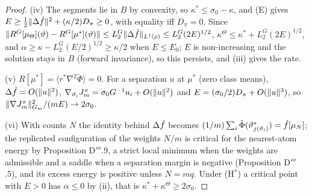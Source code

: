 \begin{proof}
(iv) The segments lie in $B$ by convexity, so $\kappa^*\le\sigma_0 - \kappa$, and (E) gives
$E\ge\frac12\lVert \Delta\hat f\rVert^2 + (\kappa/2)D_\pi\ge0$, with equality iff $D_\pi = 0$. Since
$\lVert R^G[\mu_\Theta](\vartheta) - R^G[\mu^*](\vartheta)\rVert\le L_2^G\lVert \Delta\hat f\rVert_{L^1(\rho)}
\le L_2^G(2E)^{1/2}$, $\kappa^\Theta\le\kappa^* + L_2^G(2E)^{1/2}$, and
$\alpha\ge\kappa - L_2^G(E/2)^{1/2}\ge\kappa/2$ when $E\le E_0$; $E$ is non-increasing and the solution stays in
$B$ (forward invariance), so this persists, and (iii) gives the rate.

(v) $R[\mu^*] = \langle r^*\nabla^2\tilde\Phi\rangle = 0$. For a separation $u$ at $\mu^*$ (zero class means),
$\Delta\hat f = O(\lVert u\rVert^2)$, $\nabla_{\vartheta_i}J^\pi_m = \sigma_0G^{-1} u_i + O(\lVert u\rVert^2)$ and
$E = (\sigma_0/2)D_\pi + O(\lVert u\rVert^3)$, so $\lVert \nabla J^\pi_m\rVert^2_{G_m}/(mE)\to2\sigma_0$.

(vi) With counts $N$ the identity behind $\Delta\hat f$ becomes
$(1/m)\sum_i\tilde\Phi(\vartheta^*_{j(\vartheta_i)}) = \hat f[\mu_N]$; the replicated configuration of the weights
$N/m$ is critical for the nearest-atom energy by Proposition D$'''$.9, a strict local minimum when the weights are
admissible and a saddle when a separation margin is negative (Proposition D$'''$.5), and its excess energy is
positive unless $N = mq$. Under \textup{(H$^*$)} a critical point with $E > 0$ has $\alpha\le0$ by (ii), that is
$\kappa^* + \kappa^\Theta\ge2\sigma_0$.
\end{proof}

